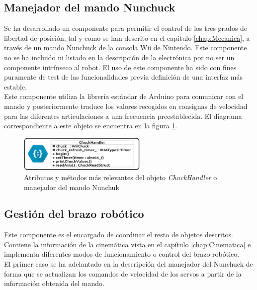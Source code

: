     \subsection{Manejador del mando Nunchuck} \label{subsec:SW:chuck_handler}
        Se ha desarrollado un componente para permitir el control de los tres grados de libertad de posición, tal y como se han descrito en el capítulo \ref{chap:Mecanica}, a través de un mando Nunchuck de la consola Wii de Nintendo. Este componente no se ha incluido ni listado en la descripción de la electrónica por no ser un componente intrínseco al robot. El uso de este componente ha sido con fines puramente de test de las funcionalidades previa definición de una interfaz más estable.
        \\
        
        Este componente utiliza la librería  estándar de Arduino para comunicar con el mando y posteriormente traduce los valores recogidos en consignas de velocidad para las diferentes articulaciones a una frecuencia preestablecida. El diagrama correspondiente a este objeto se encuentra en la figura \ref{fig:SW:class_diagram_CHH}.

        \begin{figure}[H]
          	\centering
          	\includegraphics[width=0.55\textwidth]{figuras/Imagenes_SW/class_diagram_CHH.jpg}
          	\caption{Atributos y métodos más relevantes del objeto \textit{ChuckHandler} o manejador del mando Nunchuk }
          	\label{fig:SW:class_diagram_CHH}
        \end{figure}

    \subsection{Gestión del brazo robótico} \label{subsec:SW:robotrha}
        Este componente es el encargado de coordinar el resto de objetos descritos. Contiene la información de la cinemática vista en el capítulo \ref{chap:Cinematica} e implementa diferentes modos de funcionamiento o control del brazo robótico.
        \\
        
        El primer caso se ha adelantado en la descripción del manejador del Nunchuck de forma que se actualizan los comandos de velocidad de los servos a partir de la información obtenida del mando.
        \\
        
